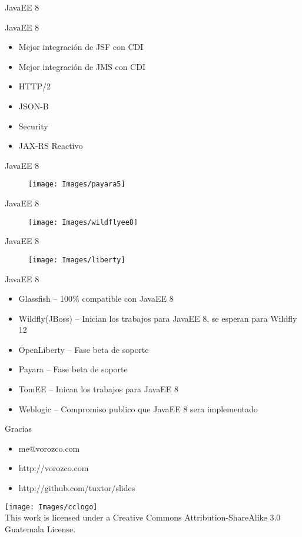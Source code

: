 \documentclass{beamer}
\begin{document}
\begin{frame}{JavaEE 8}
\begin{alertblock}{JavaEE 8}
\begin{itemize}
	\item Mejor integración de JSF con CDI
	\item Mejor integración de JMS con CDI
	\item HTTP/2
	\item JSON-B
	\item Security
	\item JAX-RS Reactivo
\end{itemize}
\end{alertblock}
\end{frame}


\begin{frame}{JavaEE 8}
\begin{figure}
\centering
\texttt{[image: Images/payara5]}
\end{figure}
\end{frame}

\begin{frame}{JavaEE 8}
\begin{figure}
\centering
\texttt{[image: Images/wildflyee8]}
\end{figure}
\end{frame}


\begin{frame}{JavaEE 8}
\begin{figure}
\centering
\texttt{[image: Images/liberty]}
\end{figure}
\end{frame}

\begin{frame}{JavaEE 8}
\begin{itemize}
\item Glassfish – 100\% compatible con JavaEE 8
\item Wildfly(JBoss) – Inician los trabajos para JavaEE 8, se esperan para Wildfly 12
\item OpenLiberty – Fase beta de soporte
\item Payara – Fase beta de soporte
\item TomEE – Inican los trabajos para JavaEE 8
\item Weblogic – Compromiso publico que JavaEE 8 sera implementado
\end{itemize}
\end{frame}



\begin{frame}{Gracias}
\begin{itemize}
\item me@vorozco.com
\item http://vorozco.com
\item http://github.com/tuxtor/slides
\end{itemize}
\begin{center}
\texttt{[image: Images/cclogo]}
\\
This work is licensed under a Creative Commons Attribution-ShareAlike 3.0 Guatemala License.
\end{center}
\end{frame}
\end{document}
